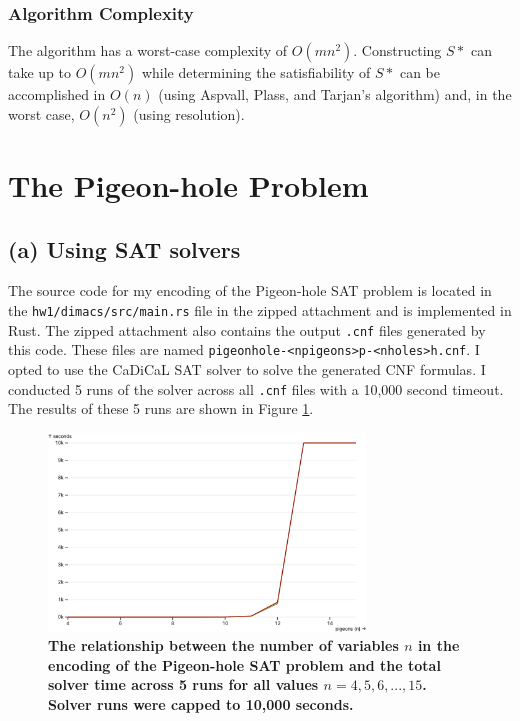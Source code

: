\documentclass{article}
\newcommand{\code}[1]{\texttt{#1}}
\begin{document}
\subsubsection{Algorithm Complexity}

\noindent The algorithm has a worst-case complexity of $O(mn^2)$. Constructing $S*$ can take up to $O(mn^2)$ while determining the satisfiability of $S*$ can be accomplished in $O(n)$ (using Aspvall, Plass, and Tarjan's algorithm) and, in the worst case, $O(n^2)$ (using resolution).

\section{The Pigeon-hole Problem}

\subsection{(a) Using SAT solvers}

\noindent The source code for my encoding of the Pigeon-hole SAT problem is located in the \code{hw1/dimacs/src/main.rs} file in the zipped attachment and is implemented in Rust. The zipped attachment also contains the output \code{.cnf} files generated by this code. These files are named \code{pigeonhole-<npigeons>p-<nholes>h.cnf}. I opted to use the CaDiCaL SAT solver \cite{biere_cadical_2022} to solve the generated CNF formulas. I conducted 5 runs of the solver across all \code{.cnf} files with a 10,000 second timeout. The results of these 5 runs are shown in Figure \ref{fig:solver-times}.

\begin{figure}[ht]
  \centering
  \includegraphics[width=0.75\textwidth]{pigeon-hole}
  \caption{\textbf{The relationship between the number of variables $n$ in the encoding of the Pigeon-hole SAT problem and the total solver time across 5 runs for all values $n = 4, 5, 6,...,15$. Solver runs were capped to 10,000 seconds.}}
  \label{fig:solver-times}
\end{figure}
\end{document}
